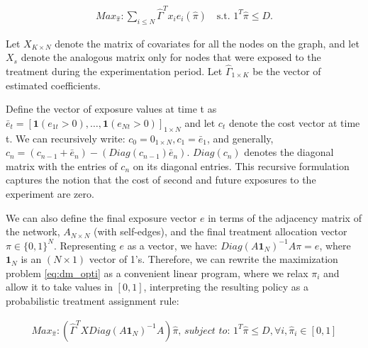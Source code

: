 \documentclass[11pt,a4paper]{article}
\begin{document}
\begin{align}\label{eq:dm_opti}
Max_{\hat \pi} : \sum_{i \leq N} \hat \Gamma^T x_i e_i(\hat \pi)  \quad \mbox{s.t. } 1^T \hat \pi \leq D .
\end{align}

\iffalse
This ends up being equivalent to this minimization (the equivalence to be clarified later):
%

$$ Min_{\hat \pi} E \left( Sup_\pi \left(\sum_{i \leq N} \Gamma^T x_i e_i(\pi) - c_\infty(\pi) \right) - \sum_{i \leq N} \hat \Gamma^T x_i e_i(\hat \pi) + c_\infty(\hat \pi) \right) $$
%
OR (depending on how $\hat \Gamma \rightarrow \Gamma$).

$$ Min_{\pi} E \left( Sup_\pi \left(\sum_{i \leq N} \Gamma^T x_i e_i(\pi) - c_\infty \right) - \sum_{i \leq N}  \Gamma^T x_i e_i(\pi) + \hat c_\infty \right) $$
\fi

Let $X_{K \times N}$ denote the matrix of covariates for all the nodes on the graph, and let $X_s$ denote the analogous matrix only for nodes that were exposed to the treatment during the experimentation period. Let $\hat \Gamma _{1 \times K}$ be the vector of estimated coefficients.

Define the vector of exposure values at time t as $\bar e_t=[\mathbf{1}(e_{1t}>0), \dots, \mathbf{1}(e_{Nt}>0)]_{1 \times N}$ and let $c_t$ denote the cost vector at time t.  We can recursively write: $c_0 = 0_{1 \times N}, c_1 = \bar e_1$, and generally, $c_n = (c_{n-1} + \bar e_n) - (Diag(c_{n-1})  \bar e_n) $. $Diag(c_n)$ denotes the diagonal matrix with the entries of $c_n$ on its diagonal entries. This recursive formulation captures the notion that the cost of second and future exposures to the experiment are zero.

We can also define the final exposure vector $e$ in terms of the adjacency matrix of the network, $A_{N \times N}$ (with self-edges), and the final treatment allocation vector $\pi \in \{0,1\}^N$. Representing $e$ as a vector, we have: $Diag(A \mathbf{1}_{N} ) ^{-1} A\pi  = e$, where $\mathbf{1}_{N}$ is an $(N \times 1)$ vector of 1's. Therefore, we can rewrite the maximization problem \eqref{eq:dm_opti} as a convenient linear program, where we relax $\pi_i$ and allow it to take values in $[0,1]$, interpreting the resulting policy as a probabilistic treatment assignment rule:

\begin{align}\label{eq:dm_opti_lin}
Max_{\hat \pi}: \left(\hat \Gamma^T X Diag(A \mathbf{1}_{N} ) ^{-1} A \right) \hat \pi  \textit{, subject to: } 1^T \hat \pi \leq D , \forall i, \hat \pi_i \in [0,1]
\end{align}
\end{document}
